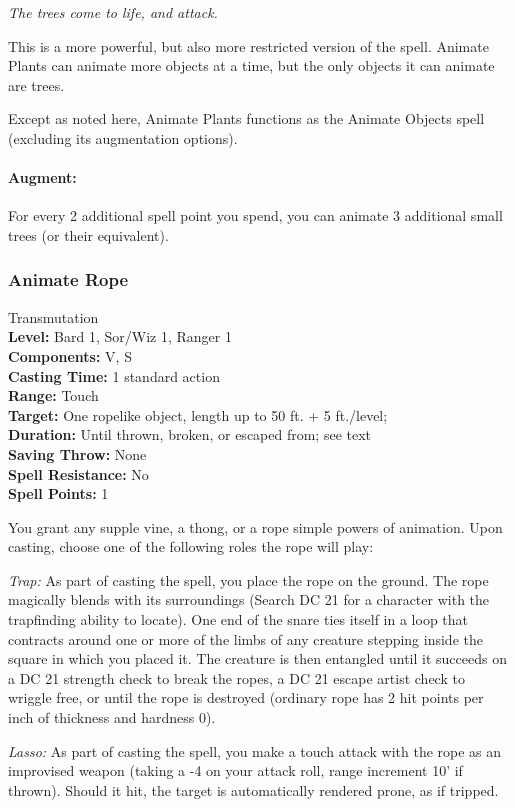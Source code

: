 \emph{The trees come to life, and attack.}

This is a more powerful, but also more restricted version of the  spell. Animate Plants can animate more objects at a time, but the only objects it can animate are trees. 

Except as noted here, Animate Plants functions as the Animate Objects spell (excluding its augmentation options).

\paragraph{Augment:} For every 2 additional spell point you spend, you can animate 3 additional small trees (or their equivalent).

\subsubsection{Animate Rope}
\label{Spell:AnimateRope}
Transmutation
\\ \textbf{Level:} Bard 1, Sor/Wiz 1, Ranger 1
\\ \textbf{Components:} V, S
\\ \textbf{Casting Time:} 1 standard action
\\ \textbf{Range:} Touch
\\ \textbf{Target:} One ropelike object, length up to 50 ft. + 5 ft./level;
\\ \textbf{Duration:} Until thrown, broken, or escaped from; see text
\\ \textbf{Saving Throw:} None
\\ \textbf{Spell Resistance:} No
\\ \textbf{Spell Points:} 1

You grant any supple vine, a thong, or a rope simple powers of animation. Upon casting, choose one of the following roles the rope will play: 

\begin{list}{}{\leftmargin=1em}
\item \emph{Trap:} As part of casting the spell, you place the rope on the ground. The rope magically blends with its surroundings (Search DC 21 for a character with the trapfinding ability to locate). One end of the snare ties itself in a loop that contracts around one or more of the limbs of any creature stepping inside the square in which you placed it. The creature is then entangled until it succeeds on a DC 21 strength check to break the ropes, a DC 21 escape artist check to wriggle free, or until the rope is destroyed (ordinary rope has 2 hit points per inch of thickness and hardness 0). 
\item \emph{Lasso:} As part of casting the spell, you make a touch attack with the rope as an improvised weapon (taking a -4 on your attack roll, range increment 10' if thrown). Should it hit, the target is automatically rendered prone, as if tripped.
\end{list}

